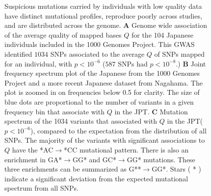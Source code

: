\documentclass[9pt,article]{template}
\begin{document}
\begin{figure}
\caption{
Suspicious mutations carried by individuals with low quality data have distinct mutational profiles, reproduce poorly across studies, and are distributed across the genome.
\textbf{A} 
Genome wide association of the average quality of mapped bases $Q$ for the 104 Japanese individuals included in the 1000 Genomes Project. 
This GWAS identified $1034$ SNPs associated to the average $Q$ of SNPs mapped for an individual, with  $p < 10^{-6}$
($587$ SNPs had  $p < 10^{-8}.$)
\textbf{B} 
Joint frequency spectrum plot of the Japanese from the 1000 Genomes Project and a more recent Japanese dataset from Nagahama.
The plot is zoomed in on frequencies below 0.5 for clarity.
The size of blue dots are proportional to the number of variants in a given frequency bin that associate with $Q$ in the JPT. 
\textbf{C} 
Mutation spectrum of the 1034 variants that associated with $Q$ in the JPT($p < 10^{-6}$), compared to the expectation from the distribution of all SNPs.
The majority of the variants with significant associations to $Q$ have the *AC${\rightarrow}$*CC mutational pattern. 
There is also an enrichment in GA*${\rightarrow}$GG* and GC*${\rightarrow}$GG* mutations. 
These three enrichments can be summarized as G**${\rightarrow}$GG*. 
Stars ( * ) indicate a significant deviation from the expected mutational spectrum from all SNPs.
}
 \label{SFS}
\end{figure}
\end{document}
